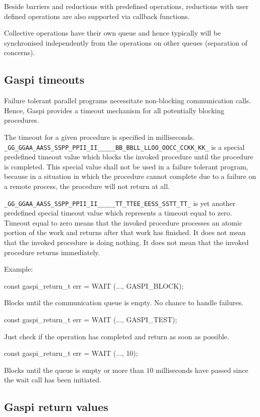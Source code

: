 \documentclass[a4paper]{article}
\makeatletter
\newlength{\st}\setlength{\st}{0pt}
\newcommand{\zerowsep}{\hskip 0pt plus 0.1pt minus 0.1pt}
\newcommand{\ZSEP}[1]{\ifx#1\@@@EOZ@@@\let\next\relax\else\ifx#1\_#1\zerowsep\else#1\fi\let\next\ZSEP\fi\next}
\newcommand{\zsep}[1]{\ZSEP{}#1\@@@EOZ@@@}
\newcommand{\GASPI}{{\sc Gaspi}}
\newcommand{\GASPITEST}{{\tt\protect\zsep{GASPI\_TEST}}}
\newcommand{\GASPIBLOCK}{{\tt\protect\zsep{GASPI\_BLOCK}}}
\makeatother
\begin{document}
Beside barriers and reductions with predefined operations,
reductions with user defined operations are also supported via callback
functions.

Collective operations have their own queue and hence typically will be synchronised
independently from the operations on other queues (separation of concerns).

\subsection{\GASPI{} timeouts}
\label{SubSec::Timeout}

Failure tolerant parallel programs necessitate non-blocking
communication calls.  Hence, \GASPI{} provides a timeout mechanism for
all potentially blocking procedures.

The timeout for a given procedure is specified in milliseconds.
\GASPIBLOCK{} is a special predefined timeout value which blocks the
invoked procedure until the procedure is completed. This special value
shall not be used in a failure tolerant program, because in a
situation in which the procedure cannot complete due to a failure on a
remote process, the procedure will not return at all.

\GASPITEST{} is yet another predefined special timeout value which
represents a timeout equal to zero. Timeout equal to zero means that
the invoked procedure processes an atomic portion of the work and
returns after that work has finished. It does not mean that the
invoked procedure is doing nothing. It does not mean that the invoked
procedure returns immediately.

Example:
\begin{listing}{1}
const gaspi_return_t err = WAIT (..., GASPI_BLOCK);
\end{listing}
Blocks until the communication queue is empty. No chance to handle
failures.
\begin{listing}{1}
const gaspi_return_t err = WAIT (..., GASPI_TEST);
\end{listing}
Just check if the operation has completed and return as soon as possible.
\begin{listing}{1}
const gaspi_return_t err = WAIT (..., 10);
\end{listing}
Blocks until the queue is empty or more than $10$ milliseconds have
passed since the wait call has been initiated.

\subsection{\GASPI{} return values}
\end{document}
